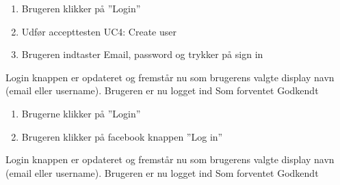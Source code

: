 

		{
		\begin{enumerate}
			\item Brugeren klikker på ''Login''
			\item Udfør accepttesten UC4: Create user
			\item Brugeren indtaster Email, password og trykker på sign in

		\end{enumerate}
		} %
		{Login knappen er opdateret og fremstår nu som brugerens valgte display navn (email eller username). Brugeren er nu logget ind} %
		{Som forventet} %
		{Godkendt} %

		{
		\begin{enumerate}
			\item Brugerne klikker på ''Login''
			\item Brugeren klikker på facebook knappen ''Log in''
		\end{enumerate}
		} %
		{Login knappen er opdateret og fremstår nu som brugerens valgte display navn (email eller username). Brugeren er nu logget ind} %
		{Som forventet} %
		{Godkendt} %


